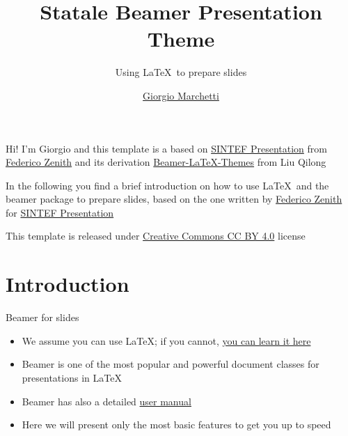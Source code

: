 \documentclass{beamer}
\title{Statale Beamer Presentation Theme}
\subtitle{Using \LaTeX\ to prepare slides}
\author{\href{mailto:ciao@gio.im}{Giorgio Marchetti}}
\newcommand{\hrefcol}[2]{\textcolor{cyan}{\href{#1}{#2}}}
\begin{document}
\maketitle

\begin{frame}

Hi! I'm Giorgio and this template is a based on \hrefcol{https://www.overleaf.com/latex/templates/sintef-presentation/jhbhdffczpnx}{SINTEF Presentation} from \hrefcol{mailto:federico.zenith@sintef.no}{Federico Zenith} and its derivation \hrefcol{https://github.com/TOB-KNPOB/Beamer-LaTeX-Themes}{Beamer-LaTeX-Themes} from Liu Qilong

\vspace{\baselineskip}

In the following you find a brief introduction on how to use \LaTeX\ and the beamer package to prepare slides, based on the one written by \hrefcol{mailto:federico.zenith@sintef.no}{Federico Zenith} for \hrefcol{https://www.overleaf.com/latex/templates/sintef-presentation/jhbhdffczpnx}{SINTEF Presentation}

This template is released under \hrefcol{https://creativecommons.org/licenses/by-nc/4.0/legalcode}{Creative Commons CC BY 4.0} license

\end{frame}


\section{Introduction}

\begin{frame}{Beamer for slides}
\begin{itemize}
    \item We assume you can use \LaTeX; if you cannot,
    \hrefcol{http://en.wikibooks.org/wiki/LaTeX/}{you can learn it here}
    \item Beamer is one of the most popular and powerful document classes for presentations in \LaTeX
    \item Beamer has also a detailed
    \hrefcol{http://www.ctan.org/tex-archive/macros/latex/contrib/beamer/doc/beameruserguide.pdf}{user manual}
    \item Here we will present only the most basic features to get you up to speed
\end{itemize}
\end{frame}
\end{document}
